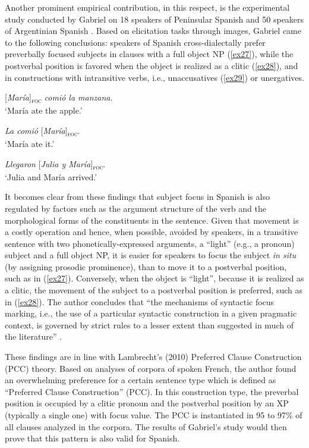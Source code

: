 Another prominent empirical contribution, in this respect, is the experimental study conducted by Gabriel on 18 speakers of Peninsular Spanish \parencite{gabriel2007fokus} and 50 speakers of Argentinian Spanish \parencite{gabriel2010focus}. Based on elicitation tasks through images, Gabriel came to the following conclusions: speakers  of  Spanish  cross-dialectally prefer  preverbally focused subjects  in  clauses  with  a  full  object NP (\ref{ex27}), while  the postverbal position is favored when the object is realized as a clitic (\ref{ex28}), and in constructions with intransitive verbs, i.e., unaccusatives (\ref{ex29}) or unergatives.

 \ea \label{ex27}
{[\textit{María}]\textsubscript{\textsc{foc}}} \normalsize \textit{comió la manzana}.\\
`María ate the apple.'

\z

 \ea \label{ex28}
\textit{La comió }{[\textit{María}]\textsubscript{\textsc{foc}}}\normalsize.\\
`María ate it.'

\z

 \ea \label{ex29}
 \textit{ Llegaron} {[\textit{Julia y María}]\textsubscript{\textsc{foc}}}\normalsize.\\
`Julia and María arrived.'\\

\z


It becomes clear from these findings that subject focus in Spanish is also regulated by factors such as the argument structure of the verb and the morphological forms of the constituents in the sentence. Given that movement is a costly operation \parencite{chomsky1991linguistics} and hence, when possible, avoided by speakers, in a transitive sentence with two phonetically-expressed arguments, a “light” (e.g., a pronoun) subject and a full object NP, it is easier for speakers to focus the subject \textit{in situ} (by assigning prosodic prominence), than to move it to a postverbal position, such as in (\ref{ex27}). Conversely, when the object is “light”, because it is realized as a clitic, the movement of the subject to a postverbal position is preferred, such as in (\ref{ex28}). The author concludes that ``the mechanisms of syntactic focus marking, i.e., the use of a particular syntactic construction in a given pragmatic context, is governed by strict rules to a lesser extent than suggested in much of the literature” \parencite[189]{gabriel2010focus}.

These findings are in line with Lambrecht's (2010) Preferred Clause Construction (PCC) theory. Based on analyses of corpora of spoken French, the author found an overwhelming preference for a certain sentence type which is defined as ``Preferred Clause Construction” (PCC). In  this construction type,  the  preverbal  position is occupied  by a clitic pronoun and the postverbal position by an XP (typically a single one) with focus value. The PCC is instantiated in 95 to 97\% of all clauses analyzed in the corpora. The results of Gabriel’s study would then prove that this pattern is also valid for Spanish.


